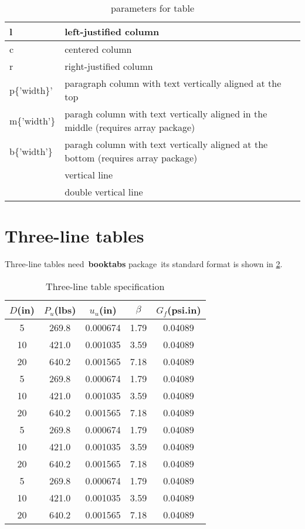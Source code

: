 \begin{table}[h]
	\caption{parameters for table} \label{tbl: parameters for table}
	\begin{tabular}{|l|l|}
		\hline
		l & left-justified column\\
		\hline
		c & centered column\\
		\hline
		r & right-justified column\\
		\hline
		p\{'width\}'& paragraph column with text vertically aligned at the top\\
		\hline
		m\{'width'\} & paragh column with text vertically aligned in the middle (requires array package)\\
		\hline
		b\{'width'\} & paragh column with text vertically aligned at the bottom (requires array package)\\
		\hline
		\textbar & vertical line \\
		\hline
		\textbardbl & double vertical line \\
		\hline
	\end{tabular}
\end{table}

\section{Three-line tables}
Three-line tables need~\textbf{booktabs} package~its standard format is shown in \cref{tab:table1}.

\begin{table}[htbp]
\caption{Three-line table specification}\label{tab:table1}
\vspace{0.5em}\centering
\begin{tabular}{ccccc}
\toprule[1.5pt]
$D$(in) & $P_u$(lbs) & $u_u$(in) & $\beta$ & $G_f$(psi.in)\\
\midrule[1pt]
 5 & 269.8 & 0.000674 & 1.79 & 0.04089\\
10 & 421.0 & 0.001035 & 3.59 & 0.04089\\
20 & 640.2 & 0.001565 & 7.18 & 0.04089\\
 5 & 269.8 & 0.000674 & 1.79 & 0.04089\\
10 & 421.0 & 0.001035 & 3.59 & 0.04089\\
20 & 640.2 & 0.001565 & 7.18 & 0.04089\\
 5 & 269.8 & 0.000674 & 1.79 & 0.04089\\
10 & 421.0 & 0.001035 & 3.59 & 0.04089\\
20 & 640.2 & 0.001565 & 7.18 & 0.04089\\
 5 & 269.8 & 0.000674 & 1.79 & 0.04089\\
10 & 421.0 & 0.001035 & 3.59 & 0.04089\\
20 & 640.2 & 0.001565 & 7.18 & 0.04089\\
\bottomrule[1.5pt]
\end{tabular}
\vspace{\baselineskip}
\end{table}

